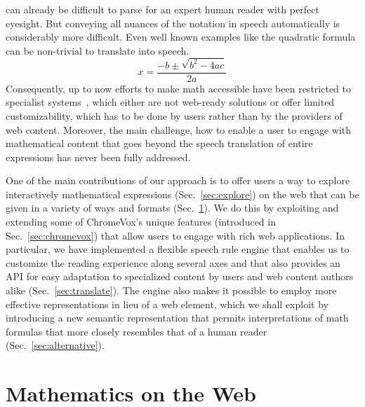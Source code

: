 \documentclass{sig-alternate}
\begin{document}
\noindent can already be difficult to parse for an expert human reader with
perfect eyesight. But conveying all nuances of the notation in speech
automatically is considerably more difficult. Even well known examples
like the quadratic formula can be non-trivial to translate into speech.
\begin{equation}
  \label{eq:quadratic}
  x=\frac{-b \pm \sqrt {b^2-4ac}}{2a}
\end{equation}
\EndAccSupp{}
Consequently, up to now efforts to make math accessible have been restricted to
specialist
systems~\cite{raman1994aster,soiffer2005mathplayer,chen2006clc,yamaguchi2008new},
which either are not web-ready solutions or offer limited customizability, which
has to be done by users rather than by the providers of web content. Moreover,
the main challenge, how to enable a user to engage with mathematical content
that goes beyond the speech translation of entire expressions has never been
fully addressed.

One of the main contributions of our approach is to offer users a way to explore
interactively mathematical expressions (Sec.~\ref{sec:explore}) on the web that
can be given in a variety of ways and formats (Sec.~\ref{sec:math}). We do this
by exploiting and extending some of ChromeVox's unique features (introduced in
Sec.~\ref{sec:chromevox}) that allow users to engage with rich web
applications. In particular, we have implemented a flexible speech rule engine
that enables us to customize the reading experience along several axes and that
also provides an API for easy adaptation to specialized content by users and web
content authors alike (Sec.~\ref{sec:translate}).  The engine also makes it
possible to employ more effective representations in lieu of a web element,
which we shall exploit by introducing a new semantic representation that permits
interpretations of math formulas that more closely resembles that of a human
reader (Sec.~\ref{sec:alternative}).


\section{Mathematics on the Web}
\label{sec:math}
\end{document}
